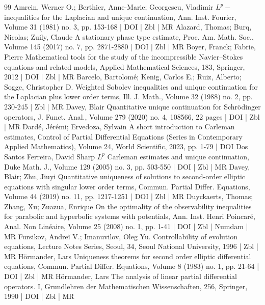 \begin{thebibliography}{99}
 Amrein, Werner O.; Berthier, Anne-Marie; Georgescu, Vladimir ${L}^ p-$inequalities for the Laplacian and unique continuation, Ann. Inst. Fourier, Volume 31 (1981) no. 3, pp. 153-168 | DOI | Zbl | MR
 Alazard, Thomas; Burq, Nicolas; Zuily, Claude A stationary phase type estimate, Proc. Am. Math. Soc., Volume 145 (2017) no. 7, pp. 2871-2880 | DOI | Zbl | MR
 Boyer, Franck; Fabrie, Pierre Mathematical tools for the study of the incompressible Navier–Stokes equations and related models, Applied Mathematical Sciences, 183, Springer, 2012 | DOI | Zbl | MR
 Barcelo, Bartolomé; Kenig, Carlos E.; Ruiz, Alberto; Sogge, Christopher D. Weighted Sobolev inequalities and unique continuation for the Laplacian plus lower order terms, Ill. J. Math., Volume 32 (1988) no. 2, pp. 230-245 | Zbl | MR
 Davey, Blair Quantitative unique continuation for Schrödinger operators, J. Funct. Anal., Volume 279 (2020) no. 4, 108566, 22 pages | DOI | Zbl | MR
 Dardé, Jérémi; Ervedoza, Sylvain A short introduction to Carleman estimates, Control of Partial Differential Equations (Series in Contemporary Applied Mathematics), Volume 24, World Scientific, 2023, pp. 1-79 | DOI
 Dos Santos Ferreira, David Sharp ${L}^p$ Carleman estimates and unique continuation, Duke Math. J., Volume 129 (2005) no. 3, pp. 503-550 | DOI | Zbl | MR
 Davey, Blair; Zhu, Jiuyi Quantitative uniqueness of solutions to second-order elliptic equations with singular lower order terms, Commun. Partial Differ. Equations, Volume 44 (2019) no. 11, pp. 1217-1251 | DOI | Zbl | MR
 Duyckaerts, Thomas; Zhang, Xu; Zuazua, Enrique On the optimality of the observability inequalities for parabolic and hyperbolic systems with potentials, Ann. Inst. Henri Poincaré, Anal. Non Linéaire, Volume 25 (2008) no. 1, pp. 1-41 | DOI | Zbl | Numdam | MR
 Fursikov, Andreĭ V.; Imanuvilov, Oleg Yu. Controllability of evolution equations, Lecture Notes Series, Seoul, 34, Seoul National University, 1996 | Zbl | MR
 Hörmander, Lars Uniqueness theorems for second order elliptic differential equations, Commun. Partial Differ. Equations, Volume 8 (1983) no. 1, pp. 21-64 | DOI | Zbl | MR
 Hörmander, Lars The analysis of linear partial differential operators. I, Grundlehren der Mathematischen Wissenschaften, 256, Springer, 1990 | DOI | Zbl | MR

\end{thebibliography}
